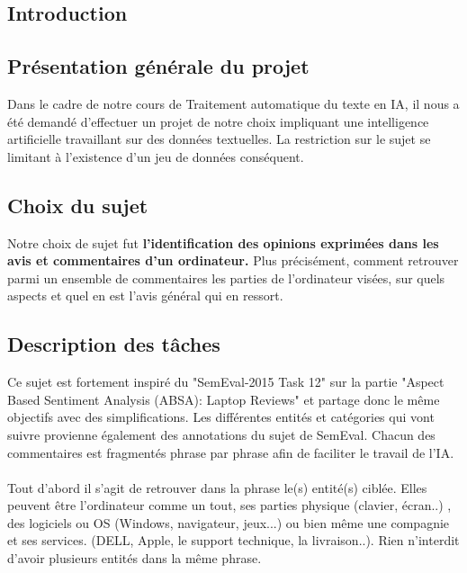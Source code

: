 \documentclass[12pt ,a4paper ]{article}
\begin{document}
\begin{multicols}{2} 
\section{Introduction}

	\subsection{Présentation générale du projet}
		Dans le cadre de notre cours de Traitement automatique du texte en IA, il nous a été demandé d'effectuer un projet de notre choix impliquant une intelligence artificielle travaillant sur des données textuelles. La restriction sur le sujet se limitant à l'existence d'un jeu de données conséquent.
	
	\subsection{Choix du sujet}
		Notre choix de sujet fut \textbf{l'identification des opinions exprimées dans les avis et commentaires d’un ordinateur.} Plus précisément, comment retrouver parmi un ensemble de commentaires les parties de l'ordinateur visées,  sur quels aspects et quel en est l'avis général qui en ressort. 
		
\subsection{Description des tâches}
Ce sujet est fortement inspiré du "SemEval-2015 Task 12" sur la partie "Aspect Based Sentiment Analysis (ABSA): Laptop Reviews" et partage donc le même objectifs avec des simplifications. Les différentes entités et catégories qui vont suivre provienne également des annotations du sujet de SemEval. Chacun des commentaires est fragmentés phrase par phrase afin de faciliter le travail de l'IA. 
		
\paragraph{}
\noindent Tout d'abord il s'agit de retrouver dans la phrase le(s) entité(s) ciblée. Elles peuvent être l'ordinateur comme un tout, ses parties physique (clavier, écran..) , des logiciels ou OS (Windows, navigateur, jeux...) ou bien même une compagnie et ses services. (DELL, Apple, le support technique, la livraison..). Rien n'interdit d'avoir plusieurs entités dans la même phrase.\\
		

\end{multicols}
\end{document}
